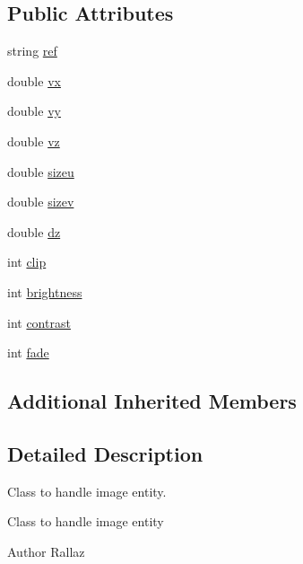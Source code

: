 \subsection*{Public Attributes}
\begin{DoxyCompactItemize}
\item 
string \hyperlink{classDRW__Image_a37432d187433c2214bb378bca78da43e}{ref}
\item 
double \hyperlink{classDRW__Image_a1f7b4a2b11aed54038b1e978a8d99527}{vx}
\item 
double \hyperlink{classDRW__Image_a955bb709e5261c3f5b3ca99bfc5765d1}{vy}
\item 
double \hyperlink{classDRW__Image_a075d00b1bc78bd275953d9730b0eaf8b}{vz}
\item 
double \hyperlink{classDRW__Image_a99a8d4b8a7fb234f002b194d0e28d247}{sizeu}
\item 
double \hyperlink{classDRW__Image_ae2408c33253799a6e03ea1bfec4f84d7}{sizev}
\item 
double \hyperlink{classDRW__Image_ada1bb1fd948f6318a4c8513e35b8224d}{dz}
\item 
int \hyperlink{classDRW__Image_a8d1f1854dc9b76525aa03fad3b007a58}{clip}
\item 
int \hyperlink{classDRW__Image_a7d088d2d2bca24de4e44cfc40e5f30bf}{brightness}
\item 
int \hyperlink{classDRW__Image_ad3ba08920ac1d83d073ba1f408cceb09}{contrast}
\item 
int \hyperlink{classDRW__Image_a29d7bf7561ed378e6f4634557aae88db}{fade}
\end{DoxyCompactItemize}
\subsection*{Additional Inherited Members}


\subsection{Detailed Description}
Class to handle image entity. 

Class to handle image entity \begin{DoxyAuthor}{Author}
Rallaz 
\end{DoxyAuthor}


